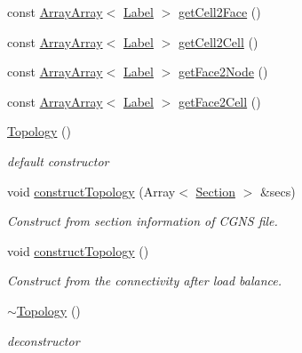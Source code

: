 \begin{DoxyCompactItemize}
const \hyperlink{classHSF_1_1ArrayArray}{ArrayArray}$<$ \hyperlink{namespaceHSF_ae65d72be782e989396ebe5ec6ae4c2b6}{Label} $>$ \hyperlink{classHSF_1_1Topology_af95390ff895b1f2f0f419c944627a02f}{getCell2Face} ()
\item 
const \hyperlink{classHSF_1_1ArrayArray}{ArrayArray}$<$ \hyperlink{namespaceHSF_ae65d72be782e989396ebe5ec6ae4c2b6}{Label} $>$ \hyperlink{classHSF_1_1Topology_a5ae4e7f4f97d8946a3319a642d0b37b9}{getCell2Cell} ()
\item 
const \hyperlink{classHSF_1_1ArrayArray}{ArrayArray}$<$ \hyperlink{namespaceHSF_ae65d72be782e989396ebe5ec6ae4c2b6}{Label} $>$ \hyperlink{classHSF_1_1Topology_a6e6fd144f43943e4cffbfda646441942}{getFace2Node} ()
\item 
const \hyperlink{classHSF_1_1ArrayArray}{ArrayArray}$<$ \hyperlink{namespaceHSF_ae65d72be782e989396ebe5ec6ae4c2b6}{Label} $>$ \hyperlink{classHSF_1_1Topology_a6265b70c435a5e60b8389dedbe880228}{getFace2Cell} ()
\item 
\hyperlink{classHSF_1_1Topology_a0248d01b1c87c4d1450771da9f841dee}{Topology} ()
\begin{DoxyCompactList}\small\item\em default constructor \item\end{DoxyCompactList}\item 
void \hyperlink{classHSF_1_1Topology_a95c9a7e1275aa1024ea624c3a2097f27}{constructTopology} (Array$<$ \hyperlink{classHSF_1_1Section}{Section} $>$ \&secs)
\begin{DoxyCompactList}\small\item\em Construct from section information of CGNS file. \item\end{DoxyCompactList}\item 
void \hyperlink{classHSF_1_1Topology_ab2ab89acd7b086d5b95a719f7869b896}{constructTopology} ()
\begin{DoxyCompactList}\small\item\em Construct from the connectivity after load balance. \item\end{DoxyCompactList}\item 
\hyperlink{classHSF_1_1Topology_a16f4d3d8b4a870cbd26794a1c8d3cc5c}{$\sim$Topology} ()
\begin{DoxyCompactList}\small\item\em deconstructor \item\end{DoxyCompactList}\item 

\end{DoxyCompactItemize}
